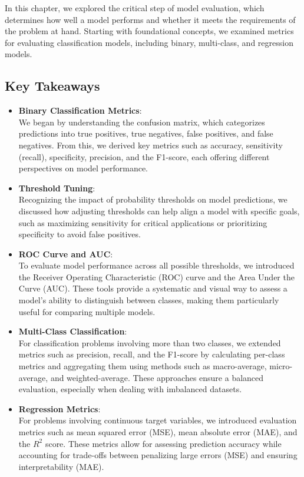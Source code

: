 \documentclass[
  11pt,
]{book}
\theoremstyle{definition}
\theoremstyle{definition}
\theoremstyle{definition}
\theoremstyle{definition}
\theoremstyle{remark}
\begin{document}
In this chapter, we explored the critical step of model evaluation, which determines how well a model performs and whether it meets the requirements of the problem at hand. Starting with foundational concepts, we examined metrics for evaluating classification models, including binary, multi-class, and regression models.

\subsection*{Key Takeaways}\label{key-takeaways-1}


\begin{itemize}
\item
  \textbf{Binary Classification Metrics}:\\
  We began by understanding the confusion matrix, which categorizes predictions into true positives, true negatives, false positives, and false negatives. From this, we derived key metrics such as accuracy, sensitivity (recall), specificity, precision, and the F1-score, each offering different perspectives on model performance.
\item
  \textbf{Threshold Tuning}:\\
  Recognizing the impact of probability thresholds on model predictions, we discussed how adjusting thresholds can help align a model with specific goals, such as maximizing sensitivity for critical applications or prioritizing specificity to avoid false positives.
\item
  \textbf{ROC Curve and AUC}:\\
  To evaluate model performance across all possible thresholds, we introduced the Receiver Operating Characteristic (ROC) curve and the Area Under the Curve (AUC). These tools provide a systematic and visual way to assess a model's ability to distinguish between classes, making them particularly useful for comparing multiple models.
\item
  \textbf{Multi-Class Classification}:\\
  For classification problems involving more than two classes, we extended metrics such as precision, recall, and the F1-score by calculating per-class metrics and aggregating them using methods such as macro-average, micro-average, and weighted-average. These approaches ensure a balanced evaluation, especially when dealing with imbalanced datasets.
\item
  \textbf{Regression Metrics}:\\
  For problems involving continuous target variables, we introduced evaluation metrics such as mean squared error (MSE), mean absolute error (MAE), and the \(R^2\) score. These metrics allow for assessing prediction accuracy while accounting for trade-offs between penalizing large errors (MSE) and ensuring interpretability (MAE).
\end{itemize}
\end{document}
